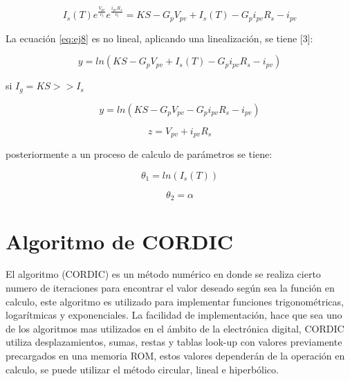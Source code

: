 \begin{equation} \label{eq:ej8}
  I_s \left(T \right) e^\frac{V_{pv}}{v_t} e^\frac{ i_{pv}R_{s}}{v_t}   
  =
  KS - G_{p}V_{pv} + I_s \left(T \right) - G_{p}i_{pv}R_s - i_{pv} 
\end{equation}

La ecuación \ref{eq:ej8} es no lineal, aplicando una linealización, se tiene [3]: 

\begin{equation} \label{eq:ej9}
  y = ln \left(KS - G_{p}V_{pv} + I_s \left(T \right) - G_{p}i_{pv}R_s - i_{pv} \right) 
\end{equation}

si $ I_g = KS >> I_s $

\begin{equation} \label{eq:ej10}
  y = ln \left(KS - G_{p}V_{pv} - G_{p}i_{pv}R_s - i_{pv} \right) 
\end{equation}

\begin{equation} \label{eq:ej11}
  z = V_{pv} + i_{pv}R_s  
\end{equation}

posteriormente a un proceso de calculo de parámetros se tiene: 

\begin{equation} \label{eq:ej12}
  \theta_1  = ln\left( I_s \left(T \right) \right)
\end{equation}

\begin{equation} \label{eq:ej13}
  \theta_2  = \alpha 
\end{equation}

\section{Algoritmo de CORDIC}

El algoritmo  (CORDIC) es un método numérico en donde se realiza cierto numero de iteraciones para encontrar el valor deseado según sea la función en calculo, este algoritmo es utilizado para implementar funciones trigonométricas, logarítmicas y  exponenciales. La facilidad de implementación, hace que sea uno de los algoritmos mas utilizados en el ámbito de la electrónica digital, CORDIC utiliza desplazamientos, sumas, restas y tablas look-up con valores previamente precargados en una memoria ROM, estos valores dependerán de la operación en calculo, se puede utilizar el método circular, lineal e hiperbólico.   

